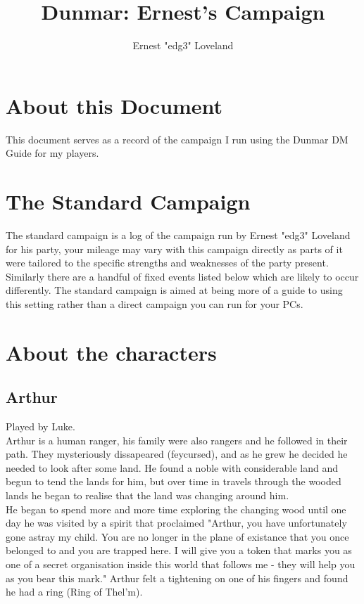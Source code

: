 \documentclass[10pt,twoside,twocolumn]{article}
\title{Dunmar: Ernest's Campaign}
\author{Ernest "edg3" Loveland}
\begin{document}
\selectfont %

\maketitle
\tableofcontents

\section{About this Document}
This document serves as a record of the campaign I run using the Dunmar DM Guide for my players.

\section{The Standard Campaign}
The standard campaign is a log of the campaign run by Ernest "edg3" Loveland for his party, your mileage may vary with this campaign directly as parts of it were tailored to the specific strengths and weaknesses of the party present. Similarly there are a handful of fixed events listed below which are likely to occur differently. The standard campaign is aimed at being more of a guide to using this setting rather than a direct campaign you can run for your PCs.

\section{About the characters}
\subsection{Arthur}
Played by Luke.\\

Arthur is a human ranger, his family were also rangers and he followed in their path. They mysteriously dissapeared (feycursed), and as he grew he decided he needed to look after some land. He found a noble with considerable land and begun to tend the lands for him, but over time in travels through the wooded lands he began to realise that the land was changing around him.\\

He began to spend more and more time exploring the changing wood until one day he was visited by a spirit that proclaimed "Arthur, you have unfortunately gone astray my child. You are no longer in the plane of existance that you once belonged to and you are trapped here. I will give you a token that marks you as one of a secret organisation inside this world that follows me - they will help you as you bear this mark." Arthur felt a tightening on one of his fingers and found he had a ring (Ring of Thel'm). \\
\end{document}
